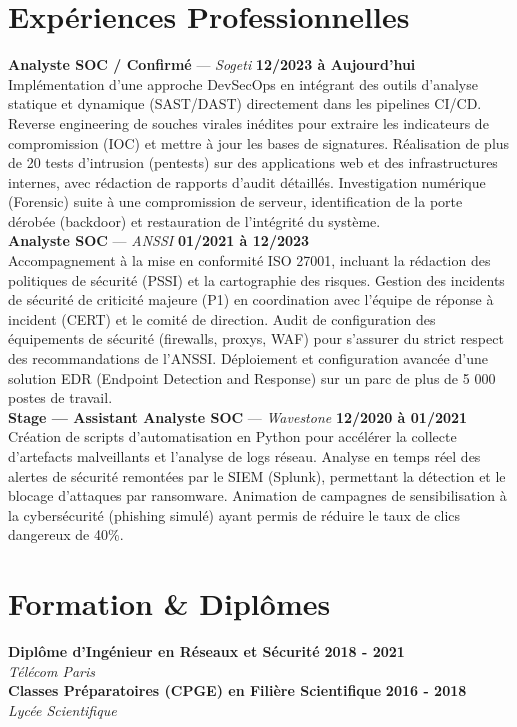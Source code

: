 \documentclass[11pt,a4paper]{article}
\begin{document}
\section*{Expériences Professionnelles}
\noindent \textbf{Analyste SOC / Confirmé} --- \textit{Sogeti} \hfill \textbf{12/2023 à Aujourd'hui} \\
Implémentation d'une approche DevSecOps en intégrant des outils d'analyse statique et dynamique (SAST/DAST) directement dans les pipelines CI/CD. Reverse engineering de souches virales inédites pour extraire les indicateurs de compromission (IOC) et mettre à jour les bases de signatures. Réalisation de plus de 20 tests d'intrusion (pentests) sur des applications web et des infrastructures internes, avec rédaction de rapports d'audit détaillés. Investigation numérique (Forensic) suite à une compromission de serveur, identification de la porte dérobée (backdoor) et restauration de l'intégrité du système. \\[0.3cm]
\noindent \textbf{Analyste SOC} --- \textit{ANSSI} \hfill \textbf{01/2021 à 12/2023} \\
Accompagnement à la mise en conformité ISO 27001, incluant la rédaction des politiques de sécurité (PSSI) et la cartographie des risques. Gestion des incidents de sécurité de criticité majeure (P1) en coordination avec l'équipe de réponse à incident (CERT) et le comité de direction. Audit de configuration des équipements de sécurité (firewalls, proxys, WAF) pour s'assurer du strict respect des recommandations de l'ANSSI. Déploiement et configuration avancée d'une solution EDR (Endpoint Detection and Response) sur un parc de plus de 5 000 postes de travail. \\[0.3cm]
\noindent \textbf{Stage — Assistant Analyste SOC} --- \textit{Wavestone} \hfill \textbf{12/2020 à 01/2021} \\
Création de scripts d'automatisation en Python pour accélérer la collecte d'artefacts malveillants et l'analyse de logs réseau. Analyse en temps réel des alertes de sécurité remontées par le SIEM (Splunk), permettant la détection et le blocage d'attaques par ransomware. Animation de campagnes de sensibilisation à la cybersécurité (phishing simulé) ayant permis de réduire le taux de clics dangereux de 40\%. \\[0.3cm]


\vspace{0.3cm}

\section*{Formation \& Diplômes}
\noindent \textbf{Diplôme d'Ingénieur en Réseaux et Sécurité} \hfill \textbf{2018 - 2021} \\
\textit{Télécom Paris} \\[0.3cm]
\noindent \textbf{Classes Préparatoires (CPGE) en Filière Scientifique} \hfill \textbf{2016 - 2018} \\
\textit{Lycée Scientifique} \\[0.3cm]
\end{document}
